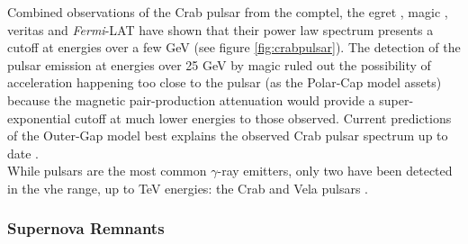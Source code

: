 \documentclass[main.tex]{subfiles}
\begin{document}
Combined observations of the Crab pulsar from the \gls{comptel}, the \gls{egret} \cite{2001CrabCOMPTEL}, \gls{magic} \cite{2008crabmagic}, \gls{veritas} \cite{2013CrabPulsarVeritas} and \textit{Fermi}-LAT \cite{2010FermiCrabPulsar} have shown that their power law spectrum presents a cutoff at energies over a few GeV (see figure \ref{fig:crabpulsar}). The detection of the pulsar emission at energies over 25 GeV by \gls{magic} ruled out the possibility of acceleration happening too close to the pulsar (as the Polar-Cap model assets) because the magnetic pair-production attenuation would provide a super-exponential cutoff at much lower energies to those observed. Current predictions of the Outer-Gap model best explains the observed Crab pulsar spectrum up to date \cite{2008gapmodels}.\\
While pulsars are the most common $\gamma$-ray emitters, only two have been detected in the \gls{vhe} range, up to TeV energies: the Crab and Vela pulsars \cite{Gajdus2016The}. 

\subsubsection{Supernova Remnants}\label{sec:SNRs}
\end{document}
